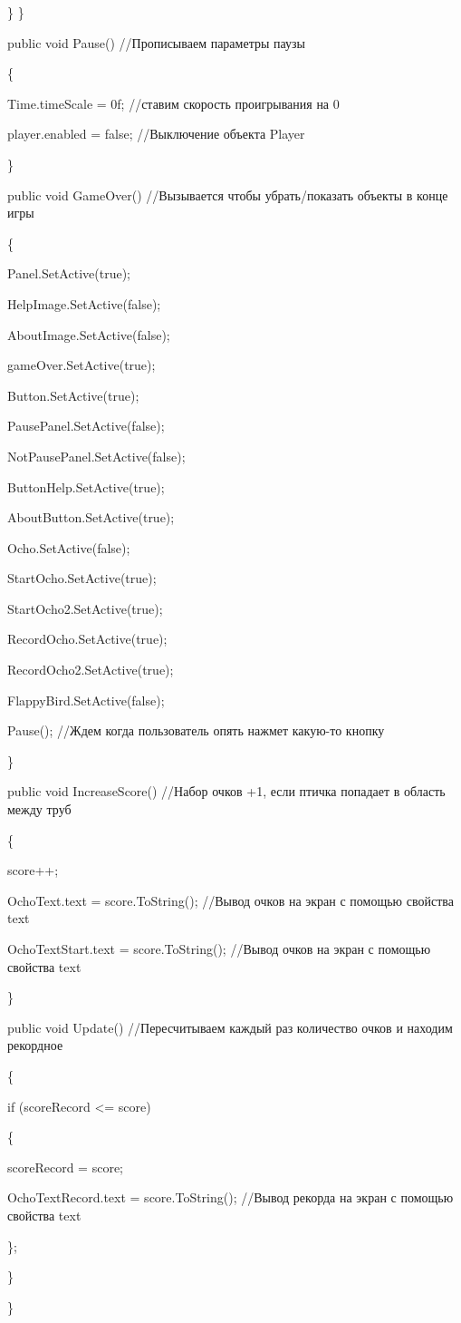 \documentclass[14pt, oneside]{altsu-report}
\begin{document}
        \}
    \}

    public void Pause() //Прописываем параметры паузы
    
    \{
    
        Time.timeScale = 0f; //ставим скорость проигрывания на 0
        
        player.enabled = false; //Выключение объекта Player
        
    \}

    public void GameOver() //Вызывается чтобы убрать/показать объекты в конце игры
    
    \{
    
        Panel.SetActive(true);
        
        HelpImage.SetActive(false);
        
        AboutImage.SetActive(false);
        
        gameOver.SetActive(true);
        
        Button.SetActive(true);

        PausePanel.SetActive(false);
        
        NotPausePanel.SetActive(false);

        ButtonHelp.SetActive(true);
        
        AboutButton.SetActive(true);

        Ocho.SetActive(false);
        
        StartOcho.SetActive(true);
        
        StartOcho2.SetActive(true);
        
        RecordOcho.SetActive(true);
        
        RecordOcho2.SetActive(true);
        
        FlappyBird.SetActive(false);

        Pause(); //Ждем когда пользователь опять нажмет какую-то кнопку
        
    \}

    public void IncreaseScore() //Набор очков +1, если птичка попадает в область между труб
    
    \{
    
        score++;
        
        OchoText.text = score.ToString(); //Вывод очков на экран с помощью свойства text
        
        OchoTextStart.text = score.ToString(); //Вывод очков на экран с помощью свойства text
        
    \}


    public void Update() //Пересчитываем каждый раз количество очков и находим рекордное
    
    \{

        if (scoreRecord <= score)
        
        \{
        
            scoreRecord = score;
            
            OchoTextRecord.text = score.ToString(); //Вывод рекорда на экран с помощью свойства text

        \};
        
    \}

\}
\end{document}
